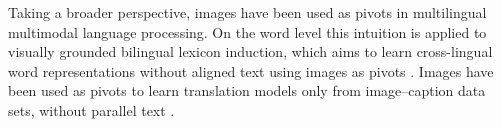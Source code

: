 Taking a broader perspective, images have been used as pivots in multilingual multimodal language processing. On the word level this intuition is 
applied to visually grounded bilingual lexicon induction, which aims to learn 
cross-lingual word representations without aligned text using images as pivots
\citep{bergsma2011learning,kiela2015visual,vulic2016multi,hartmann2017limitations,hewitt2018learning}. Images have been used as pivots to learn translation models only from image--caption
data sets, without parallel text \citep{Hitschler2016,nakayama2017zero,lee2017emergent,chen2018zero}.



